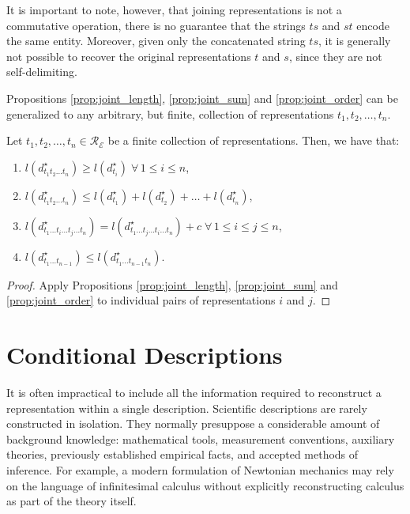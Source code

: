 It is important to note, however, that joining representations is not a commutative operation, there is no guarantee that the strings $ts$ and $st$ encode the same entity. Moreover, given only the concatenated string $ts$, it is generally not possible to recover the original representations $t$ and $s$, since they are not self-delimiting.

Propositions \ref{prop:joint_length}, \ref{prop:joint_sum} and \ref{prop:joint_order} can be generalized to any arbitrary, but finite, collection of representations $t_1, t_2, \ldots, t_n$.

\begin{proposition}
\label{prop:joint_multiple_topics}
Let $t_1, t_2, \ldots, t_n \in \mathcal{R}_\mathcal{E}$ be a finite collection of representations. Then, we have that:

\renewcommand{\theenumi}{\roman{enumi}}
\begin{enumerate}
\item $l(d_{t_1 t_2 \ldots t_n}^\star) \geq l(d_ {t_i}^\star) \; \forall \, 1 \leq i \leq n$,
\item $l(d_{t_1 t_2 \ldots t_n}^\star) \leq l(d_ {t_1}^\star) + l(d_ {t_2}^\star) + \ldots + l(d_ {t_n}^\star)$,
\item $l(d_{t_1 \ldots t_i \ldots t_j \ldots t_n}^\star) = l(d_{t_1 \ldots t_j \ldots t_i \ldots t_n}^\star) + c \; \forall \, 1 \leq i \leq j \leq n$,
\item $l(d_{t_1 \ldots t_{n-1}}^\star) \leq l(d_{t_1 \ldots t_{n-1} t_n}^\star)$.
\end{enumerate}
\end{proposition}
\begin{proof}
Apply Propositions \ref{prop:joint_length}, \ref{prop:joint_sum} and \ref{prop:joint_order} to individual pairs of representations $i$ and $j$.
\end{proof}

%
%

\section{Conditional Descriptions}
\label{sec:conditional_descriptions}

It is often impractical to include all the information required to reconstruct a representation within a single description. Scientific descriptions are rarely constructed in isolation. They normally presuppose a considerable amount of background knowledge: mathematical tools, measurement conventions, auxiliary theories, previously established empirical facts, and accepted methods of inference. For example, a modern formulation of Newtonian mechanics may rely on the language of infinitesimal calculus without explicitly reconstructing calculus as part of the theory itself.

